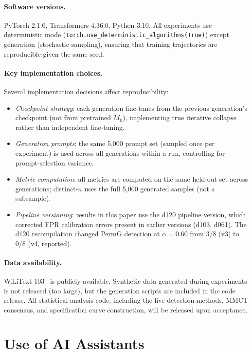 \paragraph{Software versions.}
PyTorch 2.1.0, Transformers 4.36.0, Python 3.10.
All experiments use deterministic mode (\texttt{torch.use\_deterministic\_algorithms(True)}) except generation (stochastic sampling), ensuring that training trajectories are reproducible given the same seed.

\paragraph{Key implementation choices.}
Several implementation decisions affect reproducibility:
\begin{itemize}
\item \emph{Checkpoint strategy}: each generation fine-tunes from the previous generation's checkpoint (not from pretrained $M_0$), implementing true iterative collapse rather than independent fine-tuning.
\item \emph{Generation prompts}: the same 5{,}000 prompt set (sampled once per experiment) is used across all generations within a run, controlling for prompt-selection variance.
\item \emph{Metric computation}: all metrics are computed on the same held-out set across generations; distinct-$n$ uses the full 5{,}000 generated samples (not a subsample).
\item \emph{Pipeline versioning}: results in this paper use the d120 pipeline version, which corrected FPR calibration errors present in earlier versions (d103, d061). The d120 recompilation changed PermG detection at $\alpha{=}0.60$ from 3/8 (v3) to 0/8 (v4, reported).
\end{itemize}

\paragraph{Data availability.}
WikiText-103~\citep{merity2017pointer} is publicly available.
Synthetic data generated during experiments is not released (too large), but the generation scripts are included in the code release.
All statistical analysis code, including the five detection methods, MMCT consensus, and specification curve construction, will be released upon acceptance.

\section*{Use of AI Assistants}
\label{app:ai-assistants}

